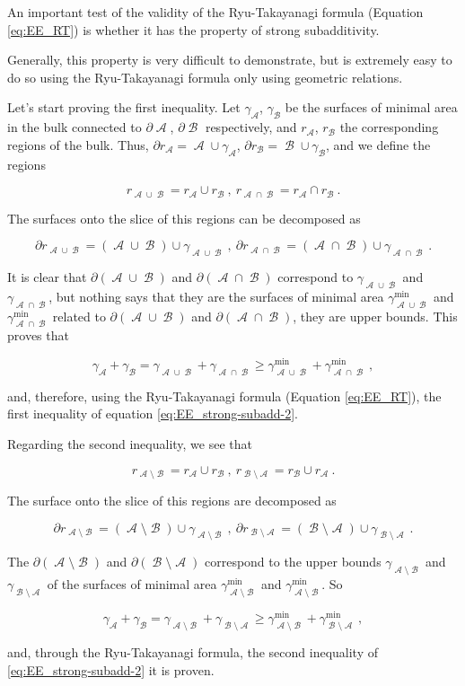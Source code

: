 \documentclass[lettersize,journal]{IEEEtran}
\providecommand{\eq}[2]{
    \begin{equation}
        #2
    \label{eq:#1}
    \end{equation}
}
\DeclareMathOperator{\calA}{\mathcal{A}}
\DeclareMathOperator{\calB}{\mathcal{B}}
\begin{document}
An important test of the validity of the Ryu-Takayanagi formula (Equation \ref{eq:EE_RT}) is whether it has the property of strong subadditivity.

Generally, this property is very difficult to demonstrate, but is extremely easy to do so using the Ryu-Takayanagi formula only using geometric relations.

Let's start proving the first inequality. Let $\gamma_{\calA}$, $\gamma_{\calB}$ be the surfaces of minimal area in the bulk connected to $\partial \calA$, $\partial \calB$ respectively, and $r_{\calA}$, $r_{\calB}$ the corresponding regions of the bulk. Thus, $\partial r_{\calA} = \calA \cup \gamma_{\calA}$, $\partial r_{\calB} = \calB \cup \gamma_{\calB}$, and we define the regions
\eq{SS_r-1}{
    r_{\calA \cup \calB} = r_{\calA} \cup r_{\calB} \ , \ r_{\calA \cap \calB} = r_{\calA} \cap r_{\calB} \ .
}
The surfaces onto the slice of this regions can be decomposed as
\eq{SS_dr-1}{
    \partial r_{\calA \cup \calB} = (\calA \cup \calB) \cup \gamma_{\calA \cup \calB} \ , \ \partial r_{\calA \cap \calB } = (\calA \cap \calB) \cup \gamma_{\calA \cap \calB} \ .
    }
It is clear that $\partial (\calA \cup \calB)$ and $\partial (\calA \cap \calB)$ correspond to $\gamma_{\calA \cup \calB}$ and $\gamma_{\calA \cap \calB}$, but nothing says that they are the surfaces of minimal area $\gamma^{\text{min}}_{\calA \cup \calB}$ and $\gamma^{\text{min}}_{\calA \cap \calB}$ related to $\partial (\calA \cup \calB)$ and $\partial (\calA \cap \calB)$, they are upper bounds. This proves that
\eq{SS_gamma-1}{
    \gamma_{\calA} + \gamma_{\calB} = \gamma_{\calA \cup \calB} + \gamma_{\calA \cap \calB} \ge \gamma^{\text{min}}_{\calA \cup \calB} + \gamma^{\text{min}}_{\calA \cap \calB} \ ,
}
and, therefore, using the Ryu-Takayanagi formula (Equation \ref{eq:EE_RT}), the first inequality of equation \ref{eq:EE_strong-subadd-2}.

Regarding the second inequality, we see that
\eq{SS_r-2}{
    r_{\calA \setminus \calB} = r_{\calA} \cup r_{\calB} \ , \ r_{\calB \setminus \calA} = r_{\calB} \cup r_{\calA} \ .
}
The surface onto the slice of this regions are decomposed as
\eq{SS_dr-2}{
    \partial r_{\calA \setminus \calB} = (\calA \setminus \calB) \cup \gamma_{\calA \setminus \calB} \ , \ \partial r_{\calB \setminus \calA } = (\calB \setminus \calA) \cup \gamma_{\calB \setminus \calA} \ .
}
The $\partial (\calA \setminus \calB)$ and $\partial (\calB \setminus \calA)$ correspond to the upper bounds $\gamma_{\calA \setminus \calB}$ and $\gamma_{\calB \setminus \calA}$ of the surfaces of minimal area $\gamma^{\text{min}}_{\calA \setminus \calB}$ and $\gamma^{\text{min}}_{\calA \setminus \calB}$. So
\eq{SS_gamma-2}{
    \gamma_{\calA} + \gamma_{\calB} = \gamma_{\calA \setminus \calB} + \gamma_{\calB \setminus \calA} \ge \gamma^{\text{min}}_{\calA \setminus \calB} + \gamma^{\text{min}}_{\calB \setminus \calA} \ ,
}
and, through the Ryu-Takayanagi formula, the second inequality of \ref{eq:EE_strong-subadd-2} it is proven.
\end{document}
